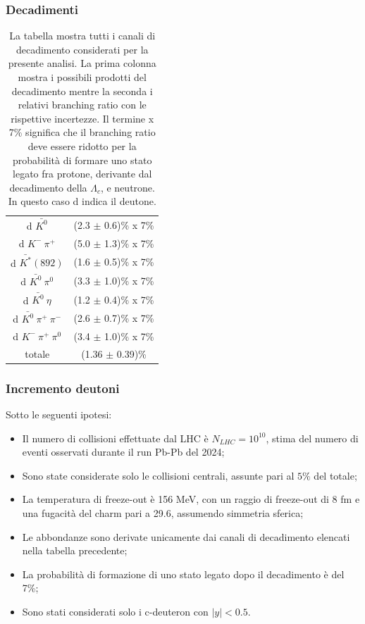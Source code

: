 \documentclass[11pt]{beamer}
\begin{document}
	\begin{frame}
		\frametitle{Decadimenti}
		\begin{table}[h]
			\centering
			\begin{tabular}{c|c}
				\hline
				\cellcolor{yellow} \text{Channel} & \cellcolor{yellow} \text{Branching ratio} \\
				\hline
				d $\bar{K^0}$ & (2.3 $\pm$ 0.6)\% x 7\% \\
				\hline
				d $K^- \ \pi^+$ &  (5.0 $\pm$ 1.3)\% x 7\% \\
				\hline
				d $\bar{K^*}(892)$ &  (1.6 $\pm$ 0.5)\% x 7\% \\
				\hline
				d $\bar{K^0} \ \pi^0$ &  (3.3 $\pm$ 1.0)\% x 7\% \\
				\hline
				d $\bar{K^0} \ \eta$ &  (1.2 $\pm$ 0.4)\% x 7\% \\
				\hline
				d $\bar{K^0} \ \pi^+ \ \pi^-$ &  (2.6 $\pm$ 0.7)\% x 7\% \\
				\hline
				d $K^- \ \pi^+ \ \pi^0$ &  (3.4 $\pm$ 1.0)\% x 7\% \\
				\hline
				totale & (1.36 $\pm$ 0.39)\% \\
				\hline
			\end{tabular}
			\caption{La tabella mostra tutti i canali di decadimento considerati per la presente analisi. La prima colonna mostra i possibili prodotti del decadimento mentre la seconda i relativi branching ratio con le rispettive incertezze. Il termine x 7\% significa che il branching ratio deve essere ridotto per la probabilità di formare uno stato legato fra protone, derivante dal decadimento della $\Lambda_c$, e neutrone. In questo caso d indica il deutone.}
			\label{tab:decay_channel}
		\end{table}
		
	\end{frame}
	
	\begin{frame}
		\frametitle{Incremento deutoni}
		Sotto le seguenti ipotesi: 
		\begin{itemize}
			\item Il numero di collisioni effettuate dal LHC è $N_{LHC} = 10^{10}$, stima del numero di eventi osservati durante il run Pb-Pb del 2024;
			\item Sono state considerate solo le collisioni centrali, assunte pari al $5\%$ del totale;
			\item La temperatura di freeze-out è 156 MeV, con un raggio di freeze-out di 8 fm e una fugacità del charm pari a 29.6, assumendo simmetria sferica;
			\item Le abbondanze sono derivate unicamente dai canali di decadimento elencati nella tabella precedente;
			\item La probabilità di formazione di uno stato legato dopo il decadimento è del 7\%;
			\item Sono stati considerati solo i c-deuteron con $|y|<0.5$.
		\end{itemize}
		
	\end{frame}
	
\end{document}
